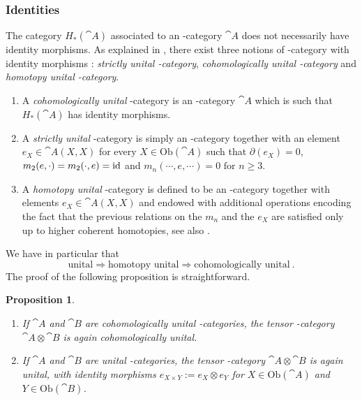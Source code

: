 \documentclass[twoside, 11pt]{amsart}
\newtheorem{proposition}[definition]{Proposition}
\theoremstyle{remark}
\begin{document}
\subsubsection{Identities}

The category $H_*(\cat{A})$ associated to an \Ainf -category $\cat{A}$ does not necessarily have identity morphisms. As explained in \cite[Section 1.2]{Seidel08}, there exist three notions of \Ainf -category with identity morphisms : \textit{strictly unital \Ainf -category}, \textit{cohomologically unital \Ainf -category} and \textit{homotopy unital \Ainf -category}. 
\begin{enumerate}[leftmargin=*]
\item A \textit{cohomologically unital} \Ainf -category is an \Ainf -category $\cat{A}$ which is such that $H_*(\cat{A})$ has identity morphisms.
\item A \textit{strictly unital} \Ainf -category is simply an \Ainf -category together with an element $e_X \in \cat{A} (X ,X )$ for every $X \in \mathrm{Ob}(\cat{A})$ such that $\partial (e_X) = 0$, $m_2 (e , \cdot ) = m_2 (\cdot , e ) = \mathrm{id}$ and $m_n ( \cdots , e , \cdots ) = 0 \text { for } n \geq 3$.
\item A \textit{homotopy unital} \Ainf -category is defined to be an \Ainf -category together with elements $e_X \in \cat{A} (X ,X )$ and endowed with additional operations encoding the fact that the previous relations on the $m_n$ and the $e_X$ are satisfied only up to higher coherent homotopies, see also \cite[Section 6.1]{HirshMilles12}.
\end{enumerate}
We have in particular that
\[  \text{unital} \Rightarrow \text{homotopy unital} \Rightarrow \text{cohomologically unital} \ . \]
The proof of the following proposition is straightforward.

\begin{proposition} $ $
\begin{enumerate}[leftmargin=*]
\item If $\cat{A}$ and $\cat{B}$ are cohomologically unital \Ainf -categories, the tensor \Ainf -category $\cat{A} \otimes \cat{B}$ is again cohomologically unital. 
\item If $\cat{A}$ and $\cat{B}$ are unital \Ainf -categories, the tensor \Ainf -category $\cat{A} \otimes \cat{B}$ is again unital, with identity morphisms $e_{X \times Y} := e_X \otimes e_Y$ for  $X \in \mathrm{Ob}(\cat{A})$ and $Y \in \mathrm{Ob}(\cat{B})$.
\end{enumerate}
\end{proposition}
\end{document}
